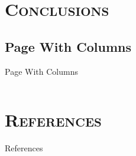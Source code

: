 \documentclass[xcolor=x11names,compress]{beamer}
\renewcommand{\(}{\begin{columns}}
\renewcommand{\)}{\end{columns}}
\newcommand{\<}[1]{\begin{column}{#1}}
\renewcommand{\>}{\end{column}}
\begin{document}
\section{\scshape Conclusions}
\subsection{Page With Columns}
\begin{frame}{Page With Columns}
\begin{columns}
\begin{column}[left]{0.5\textwidth}

\end{column}
\begin{column}[right]{0.5\textwidth}

\end{column}
\end{columns}
\end{frame}

\section{\scshape References}
\begin{frame}{References}


\end{frame}
\end{document}
